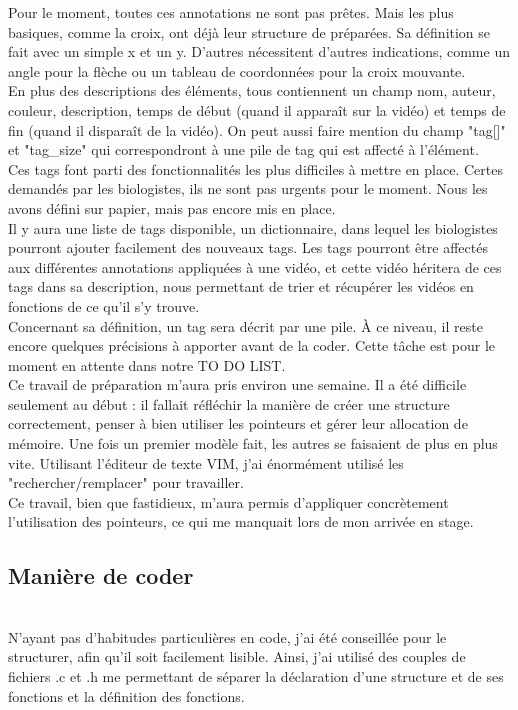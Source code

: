 \documentclass[11pt,french,a4paper]{report}
\begin{document}
Pour le moment, toutes ces annotations ne sont pas prêtes. Mais les plus basiques, comme la croix, ont déjà leur structure de préparées.
Sa définition se fait avec un simple x et un y. D'autres nécessitent d'autres indications, comme un angle pour la flèche
ou un tableau de coordonnées pour la croix mouvante. \\
En plus des descriptions des éléments, tous contiennent un champ nom, auteur, couleur, description, temps de début 
(quand il apparaît sur la vidéo) et temps de fin (quand il disparaît de la vidéo). 
On peut aussi faire mention du champ "tag[]" et "tag\_size" qui correspondront à une pile de tag qui est affecté à l'élément. \\
Ces tags font parti des fonctionnalités les plus difficiles à mettre en place. Certes demandés par les biologistes, ils ne sont 
pas urgents pour le moment. Nous les avons défini sur papier, mais pas encore mis en place. \\
Il y aura une liste de tags disponible, un dictionnaire, dans lequel les biologistes pourront 
ajouter facilement des nouveaux tags. Les tags pourront être affectés aux différentes annotations appliquées
à une vidéo, et cette vidéo héritera de ces tags dans sa description, nous permettant de trier et récupérer les vidéos 
en fonctions de ce qu'il s'y trouve. \\
Concernant sa définition, un tag sera décrit par une pile. À ce niveau, il reste encore quelques précisions à apporter
avant de la coder. Cette tâche est pour le moment en attente dans notre TO DO LIST.\\
Ce travail de préparation m'aura pris environ une semaine. Il a été difficile seulement au début : il fallait réfléchir 
la manière de créer une structure correctement, penser à bien utiliser les pointeurs et gérer leur allocation de
mémoire. Une fois un premier modèle fait, les autres se faisaient de plus en plus vite. Utilisant l'éditeur de texte VIM, j'ai 
énormément utilisé les "rechercher/remplacer" pour travailler. \\
Ce travail, bien que fastidieux, m'aura permis d'appliquer concrètement l'utilisation des pointeurs, ce qui 
me manquait lors de mon arrivée en stage. \\ 

        \subsection{Manière de coder}\\
N'ayant pas d'habitudes particulières en code, j'ai été conseillée pour le structurer, afin qu'il 
soit facilement lisible. Ainsi, j'ai utilisé des couples de fichiers .c et .h me permettant de séparer 
la déclaration d'une structure et de ses fonctions et la définition des fonctions.
\end{document}
